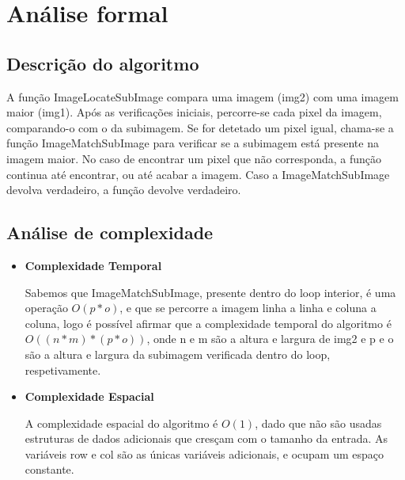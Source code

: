 \section{Análise formal}
\label{sec:imagelocatesubimage/formal}

\subsection{Descrição do algoritmo}

A função ImageLocateSubImage compara uma imagem (img2) com uma imagem maior (img1). Após as verificações iniciais, percorre-se cada pixel da imagem, comparando-o com o da subimagem. Se for detetado um pixel igual, chama-se a função ImageMatchSubImage para verificar se a subimagem está presente na imagem maior. No caso de encontrar um pixel que não corresponda, a função continua até encontrar, ou até acabar a imagem. Caso a ImageMatchSubImage devolva verdadeiro, a função devolve verdadeiro.

\subsection{Análise de complexidade}

\begin{itemize}
    
\item
\textbf{Complexidade Temporal}

Sabemos que ImageMatchSubImage, presente dentro do loop interior, é uma operação $O(p*o)$, e que se percorre a imagem linha a linha e coluna a coluna, logo é possível afirmar que a complexidade temporal do algoritmo é $O((n*m)*(p*o))$, onde n e m são a altura e largura de img2 e p e o são a altura e largura da subimagem verificada dentro do loop, respetivamente.

\item
\textbf{Complexidade Espacial}

A complexidade espacial do algoritmo é $O(1)$, dado que não são usadas estruturas de dados adicionais que cresçam com o tamanho da entrada. As variáveis row e col são as únicas variáveis adicionais, e ocupam um espaço constante.

\end{itemize}
